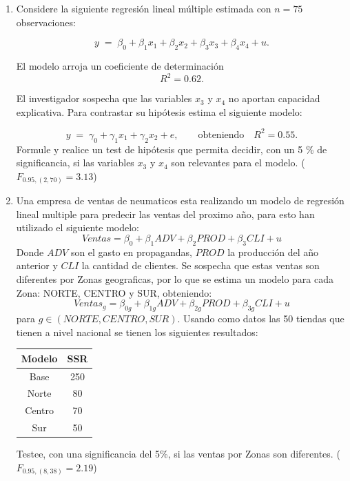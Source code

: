 \documentclass[10pt,a4paper]{article}
\begin{document}
\begin{enumerate}
\item Considere la siguiente regresión lineal múltiple estimada con \(n = 75\) observaciones:

\[
y \;=\; \beta_{0} + \beta_{1}x_{1} + \beta_{2}x_{2} + \beta_{3}x_{3} + \beta_{4}x_{4} + u.
\]

El modelo arroja un coeficiente de determinación
\[
R^2 = 0.62.
\]

El investigador sospecha que las variables \(x_{3}\) y \(x_{4}\) no aportan capacidad explicativa.  
Para contrastar su hipótesis estima el siguiente modelo:

\[
y \;=\; \gamma_{0} + \gamma_{1}x_{1} + \gamma_{2}x_{2} + e,
\qquad\text{obteniendo}\quad
R^2 = 0.55.
\]
Formule y realice un test de hipótesis que permita decidir, con un 5 \% de significancia, si las variables \(x_{3}\) y \(x_{4}\) son relevantes para el modelo. ($F_{0.95,(2,70)}=3.13$)

\item Una empresa de ventas de neumaticos esta realizando un modelo de regresión lineal multiple para predecir las ventas del proximo año, para esto han utilizado el siguiente modelo:
$$Ventas = \beta_0 + \beta_1ADV + \beta_2PROD+\beta_3CLI + u$$
Donde $ADV$ son el gasto en propagandas, $PROD$ la producción del año anterior y $CLI$ la cantidad de clientes. Se sospecha que estas ventas son diferentes por Zonas geograficas, por lo que se estima un modelo para cada Zona: NORTE, CENTRO y SUR, obteniendo: 
$$Ventas_{g} = \beta_{0g} + \beta_{1g}ADV + \beta_{2g}PROD+\beta_{3g}CLI + u$$
para $g \in {(NORTE,CENTRO,SUR)}$. Usando como datos las 50 tiendas que tienen a nivel nacional se tienen los siguientes resultados:
\begin{center}
    \begin{tabular}{|c|c|}
    \hline
        Modelo & SSR \\
        \hline
        Base & 250 \\
        \hline
        Norte & 80 \\
        \hline
        Centro & 70 \\
        \hline
        Sur & 50 \\
        \hline
    \end{tabular}
\end{center}
Testee, con una significancia del 5\%, si las ventas por Zonas son diferentes. ($F_{0.95,(8,38)}=2.19$)

\end{enumerate}
\end{document}
